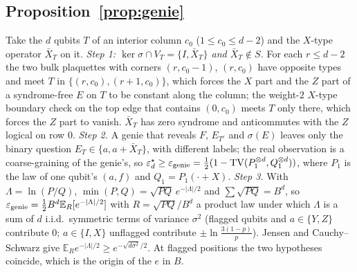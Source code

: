 \documentclass[11pt,a4paper]{article}
\theoremstyle{plain}
\theoremstyle{definition}
\theoremstyle{remark}
\newcommand{\E}{\mathbb{E}}
\newcommand{\err}{\varepsilon^{\star}}
\begin{document}
\subsection{Proposition~\ref{prop:genie}}
Take the $d$ qubits $T$ of an interior column $c_0$ ($1\le c_0\le d-2$) and the $X$-type operator $\bar X_T$ on it. \emph{Step 1: $\ker\sigma\cap V_T=\{I,\bar X_T\}$ and $\bar X_T\notin S$.} For each $r\le d-2$ the two bulk plaquettes with corners $(r,c_0-1)$, $(r,c_0)$ have opposite types and meet $T$ in $\{(r,c_0),(r+1,c_0)\}$, which forces the $X$ part and the $Z$ part of a syndrome-free $E$ on $T$ to be constant along the column; the weight-$2$ $X$-type boundary check on the top edge that contains $(0,c_0)$ meets $T$ only there, which forces the $Z$ part to vanish. $\bar X_T$ has zero syndrome and anticommutes with the $Z$ logical on row $0$. \emph{Step 2.} A genie that reveals $F$, $E_{T^c}$ and $\sigma(E)$ leaves only the binary question $E_T\in\{a,a+\bar X_T\}$, with different labels; the real observation is a coarse-graining of the genie's, so $\err_d\ge\varepsilon_{\rm genie}=\tfrac12(1-\mathrm{TV}(P_1^{\otimes d},Q_1^{\otimes d}))$, where $P_1$ is the law of one qubit's $(a,f)$ and $Q_1=P_1(\cdot+X)$. \emph{Step 3.} With $\Lambda=\ln(P/Q)$, $\min(P,Q)=\sqrt{PQ}\,e^{-|\Lambda|/2}$ and $\sum\sqrt{PQ}=B^d$, so $\varepsilon_{\rm genie}=\tfrac12B^d\E_R[e^{-|\Lambda|/2}]$ with $R=\sqrt{PQ}/B^d$ a product law under which $\Lambda$ is a sum of $d$ i.i.d.\ symmetric terms of variance $\sigma^2$ (flagged qubits and $a\in\{Y,Z\}$ contribute $0$; $a\in\{I,X\}$ unflagged contribute $\pm\ln\frac{3(1-p)}p$). Jensen and Cauchy--Schwarz give $\E_Re^{-|\Lambda|/2}\ge e^{-\sqrt{d\sigma^2}/2}$. At flagged positions the two hypotheses coincide, which is the origin of the $e$ in $B$.
\end{document}
